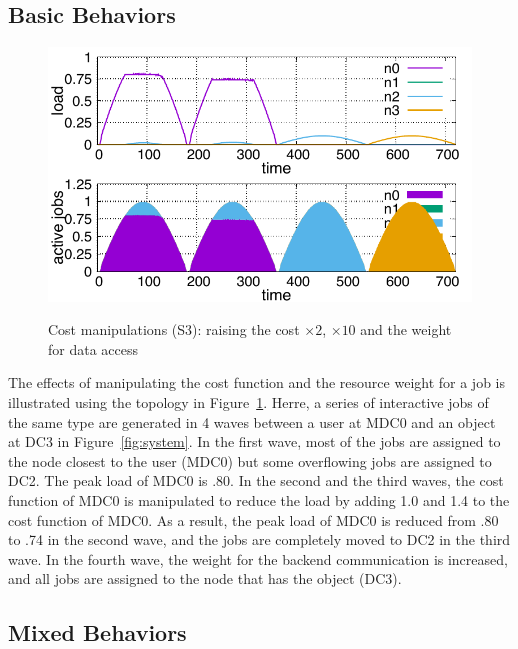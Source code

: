 \subsection{Basic Behaviors}

\begin{figure}[tb]
  \begin{center}
    \includegraphics[width=1.0\columnwidth]{lowering.pdf}
    \vspace{-2.0ex}
    \caption{Cost manipulations (S3): raising the cost $\times2$,
      $\times10$ and the weight for data access}
    \label{fig:lowering}
  \end{center}
\end{figure}

The effects of manipulating the cost function and the resource weight
for a job is illustrated using the topology in Figure~\ref{fig:lowering}.
Herre, a series of interactive jobs of the same type are generated in
4 waves between a user at MDC0 and an object at DC3 in
Figure~\ref{fig:system}.
In the first wave,  most of the jobs are assigned to the node closest
to the user (MDC0) but some overflowing jobs are assigned to DC2.
The peak load of MDC0 is .80.
In the second and the third waves, the cost function of MDC0 is
manipulated to reduce the load by adding 1.0 and 1.4 to the cost
function of MDC0. As a result, the peak load of MDC0 is reduced from
.80 to .74 in the second wave, and the jobs are completely moved to
DC2 in the third wave.
In the fourth wave, the weight for the backend communication is
increased, and all jobs are assigned to the node that has the object
(DC3).

\subsection{Mixed Behaviors}

